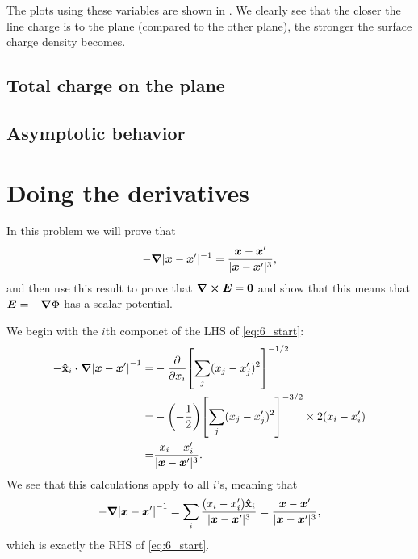 \documentclass[11pt,letter, swedish, english
]{article}
\begin{document}
The plots using these variables are shown in . We
clearly see that the closer the line charge is to the plane (compared
to the other plane), the stronger the surface charge density becomes. 

\subsection{Total charge on the plane}


\subsection{Asymptotic behavior}





\section{Doing the derivatives}
In this problem we will prove that
\begin{equation}\label{eq:6_start}
-\grad|\vb*x-\vb*x'|^{-1}
=\frac{\vb*x-\vb*x'}{|\vb*x-\vb*x'|^{3}},
\end{equation}
and then use this result to prove that $\curl\vb*E=\vb0$ and show that
this means that $\vb*E=-\grad\Phi$ has a scalar potential.

We begin with the $i$th componet of the LHS of \eqref{eq:6_start}:
\begin{equation}
\begin{aligned}
-\vu{x}_i\vdot\grad\qty|\vb*x-\vb*x'|^{-1}
=&-\pdv{x_i}\qty[\sum_j(x_j-x_j')^2]^{-1/2}\\
=&-\qty(-\frac{1}{2})\qty[\sum_j(x_j-x_j')^2]^{-3/2}
\times 2(x_i-x_i')\\
=&\frac{x_i-x_i'}{|\vb*x-\vb*x'|^3}.
\end{aligned}
\end{equation}
We see that this calculations apply to all $i$'s, meaning that
\begin{equation}
-\grad\qty|\vb*x-\vb*x'|^{-1}=
\sum_i\frac{(x_i-x_i')\vu{x}_i}{|\vb*x-\vb*x'|^3}
=\frac{\vb*x-\vb*x'}{|\vb*x-\vb*x'|^{3}},
\end{equation}
which is exactly the RHS of \eqref{eq:6_start}.
\end{document}
